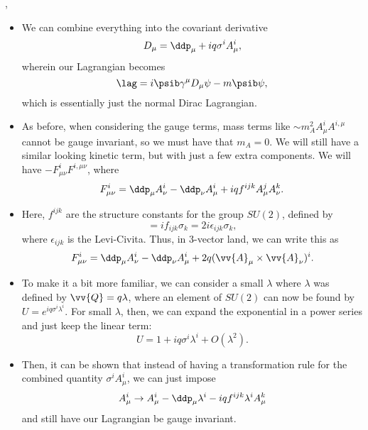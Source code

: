 \sep

\begin{itemize}
    \item We can combine everything into the covariant derivative
        \begin{equation}
            D_{\mu} = \ddp_{\mu} + iq \sigma^iA_{\mu}^i,
        \end{equation}
        wherein our Lagrangian becomes
        \begin{equation}
            \lag = i\psib \gamma^{\mu}D_{\mu} \psi - m\psib\psi,
        \end{equation}
        which is essentially just the normal Dirac Lagrangian.
    \item As before, when considering the gauge terms, mass terms like $\sim m_A^2 A_{\mu}^iA^{i,\mu}$ cannot be gauge invariant, so we must have that $m_A=0$. We will still have a similar looking kinetic term, but with just a few extra components. We will have $-F_{\mu\nu}^i F^{i,\mu\nu}$, where
        \begin{equation}
            F_{\mu\nu}^i = \ddp_{\mu}A_{\nu}^i - \ddp_{\nu}A_{\mu}^i + iqf^{ijk} A_{\mu}^j A_{\nu}^k.
        \end{equation}
    \item Here, $f^{ijk}$ are the structure constants for the group $SU(2)$, defined by 
        \begin{equation}
            [\sigma_i,\sigma_j] = if_{ijk}\sigma_k = 2i \epsilon_{ijk} \sigma_k,
        \end{equation}
        where $\epsilon_{ijk}$ is the Levi-Civita. Thus, in 3-vector land, we can write this as
        \begin{equation}
            F_{\mu\nu}^i = \ddp_{\mu}A_{\nu}^i - \ddp_{\nu}A_{\mu}^i + 2q(\vv{A}_{\mu} \times \vv{A}_{\nu})^i.
        \end{equation}
    \item To make it a bit more familiar, we can consider a small $\lambda$ where $\lambda$ was defined by $\vv{Q} = q{\lambda}$, where an element of $SU(2)$ can now be found by $U = e^{iq \sigma^i\lambda^i}$. For small $\lambda$, then, we can expand the exponential in a power series and just keep the linear term:
        \begin{equation}
            U = 1 + iq \sigma^i\lambda^i + O(\lambda^2).
        \end{equation}
    \item Then, it can be shown that instead of having a transformation rule for the combined quantity $\sigma^iA_{\mu}^i$, we can just impose
        \begin{equation}
            A_{\mu}^i \rightarrow A_{\mu}^i - \ddp_{\mu}\lambda^i - iq f^{ijk}\lambda^iA_{\mu}^k
        \end{equation}
        and still have our Lagrangian be gauge invariant.
\end{itemize}
